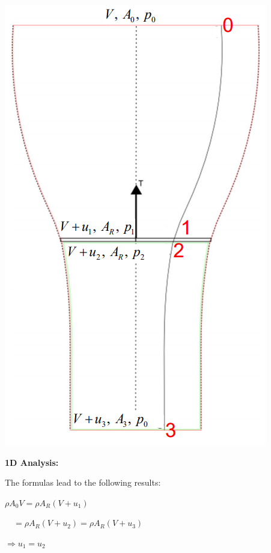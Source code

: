 \documentclass[fontsize=6pt,DIV=calc,a4paper,ngerman]{scrartcl}
\begin{document}
\begin{multicols*}{4}
	\smallskip
	\begin{minipage}{0.35\linewidth}
		\includegraphics[width=\linewidth]{1danalysis.png}
	\end{minipage}\hfill
	\begin{minipage}{0.6\linewidth}
		\textbf{1D Analysis:}

		\medskip
		The formulas lead to the following results:

		$\rho A_0 V = \rho A_R (V+u_1)$

		$\quad = \rho A_R (V+u_2)= \rho A_R (V+u_3)$

		$\Rightarrow u_1=u_2$


\end{minipage}
\end{multicols*}
\end{document}
